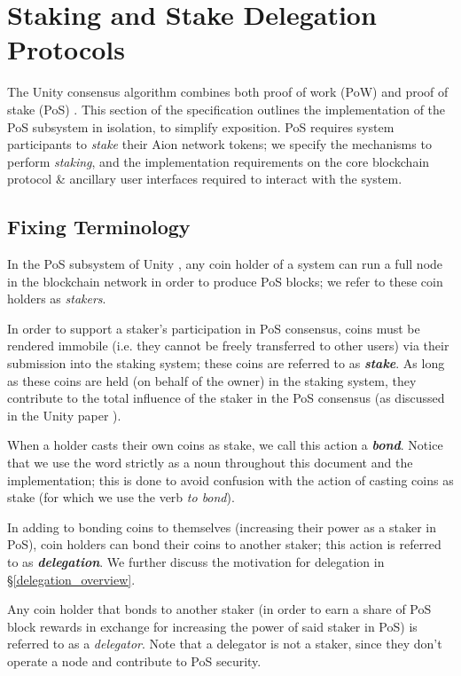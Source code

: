 \section{Staking and Stake Delegation Protocols}

The Unity consensus algorithm combines both proof of work (PoW) and proof of stake (PoS) \cite{WZS19}. This section of the specification outlines the implementation of the PoS subsystem in isolation, to simplify exposition. PoS requires system participants to \textit{stake} their Aion network tokens; we specify the mechanisms to perform \textit{staking}, and the implementation requirements on the core blockchain protocol \& ancillary user interfaces required to interact with the system. 

\subsection{Fixing Terminology}
In the PoS subsystem of Unity \cite{WZS19}, any coin holder of a system can run a full node in the blockchain network in order to produce PoS blocks; we refer to these coin holders as \textit{stakers}.

In order to support a staker's participation in PoS consensus, coins must be rendered immobile (i.e. they cannot be freely transferred to other users) via their submission into the staking system; these coins are referred to as \textbf{\textit{stake}}. As long as these coins are held (on behalf of the owner) in the staking system, they contribute to the total influence of the staker in the PoS consensus (as discussed in the Unity paper \cite{WZS19}). 

When a holder casts their own coins as stake, we call this action a \textbf{\textit{bond}}. Notice that we use the word  strictly as a noun throughout this document and the implementation; this is done to avoid confusion with the action of casting coins as stake (for which we use the verb \textit{to bond}). 

In adding to bonding coins to themselves (increasing their power as a staker in PoS), coin holders can bond their coins to another staker; this action is referred to as \textbf{\textit{delegation}}. We further discuss the motivation for delegation in \S\ref{delegation_overview}.

Any coin holder that bonds to another staker (in order to earn a share of PoS block rewards in exchange for increasing the power of said staker in PoS) is referred to as a \textit{delegator}. Note that a delegator is not a staker, since they don't operate a node and contribute to PoS security.

